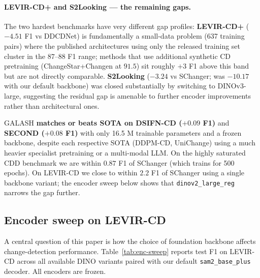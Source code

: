 \paragraph{LEVIR-CD+ and S2Looking — the remaining gaps.}
The two hardest benchmarks have very different gap profiles:
\textbf{LEVIR-CD+} ($-4.51$ F1 vs DDCDNet) is fundamentally a small-data
problem (637 training pairs) where the published architectures using only
the released training set cluster in the $87$--$88$ F1 range; methods that
use additional synthetic CD pretraining
(ChangeStar+Changen at $91.5$) sit roughly $+3$ F1 above this band but are
not directly comparable. \textbf{S2Looking} ($-3.24$ vs SChanger; was
$-10.17$ with our default backbone) was closed substantially by switching
to DINOv3-large, suggesting the residual gap is amenable to further
encoder improvements rather than architectural ones.

GALASH \textbf{matches or beats SOTA on DSIFN-CD ($+0.09$ F1)} and
\textbf{SECOND ($+0.08$ F1)} with only 16.5 M trainable parameters and a
frozen backbone, despite each respective SOTA (DDPM-CD, UniChange) using a
much heavier specialist pretraining or a multi-modal LLM. On the highly
saturated CDD benchmark we are within $0.87$ F1 of SChanger (which trains
for 500 epochs). On LEVIR-CD we close to within $2.2$ F1 of SChanger using
a single backbone variant; the encoder sweep below shows that
\texttt{dinov2\_large\_reg} narrows the gap further.

\subsection{Encoder sweep on LEVIR-CD}
\label{sec:enc-sweep}

A central question of this paper is how the choice of foundation backbone
affects change-detection performance. Table~\ref{tab:enc-sweep} reports
test F1 on LEVIR-CD across all available DINO variants paired with our
default \texttt{sam2\_base\_plus} decoder. All encoders are frozen.

